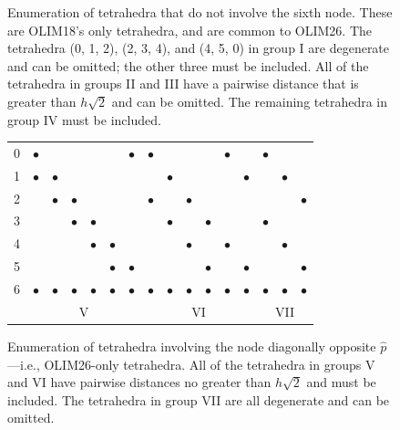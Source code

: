 \documentclass[eikonal.tex]{subfiles}
\begin{document}
\begin{figure}[H]
  \caption{Enumeration of tetrahedra that do not involve the sixth
    node. These are OLIM18's only tetrahedra, and are common to
    OLIM26. The tetrahedra (0, 1, 2), (2, 3, 4), and (4, 5, 0) in
    group I are degenerate and can be omitted; the other three must be
    included. All of the tetrahedra in groups II and III have a
    pairwise distance that is greater than $h \sqrt{2}$ and can be
    omitted. The remaining tetrahedra in group IV must be
    included.}\label{fig:olim18-tetrahedra}
  \vspace{1em}
  \begin{tabular}{c|cccccc|cccccc|ccc}
    0 & $\bullet$ & & & & & $\bullet$ & $\bullet$ & & & & $\bullet$ & & $\bullet$ & & \\
    1 & $\bullet$ & $\bullet$ & & & & & & $\bullet$ & & & & $\bullet$ & & $\bullet$ & \\
    2 & & $\bullet$ & $\bullet$ & & & & $\bullet$ & & $\bullet$ & & & & & & $\bullet$ \\
    3 & & & $\bullet$ & $\bullet$ & & & & $\bullet$ & & $\bullet$ & & & $\bullet$ & & \\
    4 & & & & $\bullet$ & $\bullet$ & & & & $\bullet$ & & $\bullet$ & & & $\bullet$ & \\
    5 & & & & & $\bullet$ & $\bullet$ & & & & $\bullet$ & & $\bullet$ & & & $\bullet$ \\
    6 & $\bullet$ & $\bullet$ & $\bullet$ & $\bullet$ & $\bullet$ & $\bullet$ & $\bullet$ & $\bullet$ & $\bullet$ & $\bullet$ & $\bullet$ & $\bullet$ & $\bullet$ & $\bullet$ & $\bullet$ \\
    \multicolumn{1}{c}{} & \multicolumn{6}{c}{V} & \multicolumn{6}{c}{VI} & \multicolumn{3}{c}{VII}
  \end{tabular}
  \caption{Enumeration of tetrahedra involving the node diagonally
    opposite $\hat{p}$---i.e., OLIM26-only tetrahedra. All of the
    tetrahedra in groups V and VI have pairwise distances no greater
    than $h \sqrt{2}$ and must be included. The tetrahedra in group
    VII are all degenerate and can be
    omitted.}\label{fig:olim26-tetrahedra}
  \vspace{1em}
\end{figure}
\end{document}
